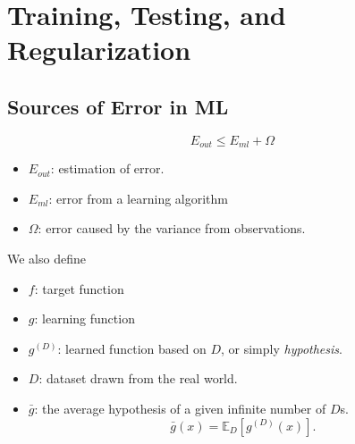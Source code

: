 \chapter{Training, Testing, and Regularization}
\section{Sources of Error in ML}
$$E_{out} \leq E_{ml}+\Omega$$
\begin{itemize}
	\item $E_{out}$: estimation of error. 
	\item $E_{ml}$: error from a learning algorithm
	\item $\Omega$: error caused by the variance from observations. 
\end{itemize}
We also define 
\begin{itemize}
	\item $f$: target function
	\item $g$: learning function
	\item $g^{(D)}$: learned function based on $D$, or simply \textit{hypothesis}.
	\item $D$: dataset drawn from the real world.
	\item $\bar{g}$: the average hypothesis of a given infinite number of $D$s. 
		$$\bar{g}(x) = \mathbb{E}_D[g^{(D)}(x)].$$
\end{itemize}

